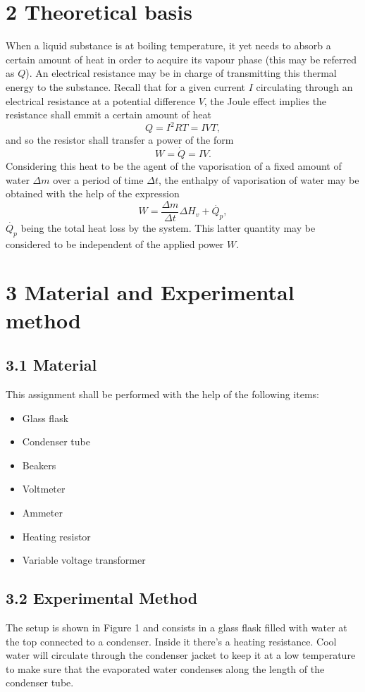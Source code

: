 \documentclass[a4paper, 12pt]{article}
\begin{document}
	\section{2 Theoretical basis}
	When a liquid substance is at boiling temperature, it yet needs to absorb a certain amount of heat in order to acquire its vapour phase (this may be referred as $Q$). An electrical resistance may be in charge of transmitting this thermal energy to the substance. Recall that for a given current $I$ circulating through an electrical resistance at a potential difference $V$, the Joule effect implies the resistance shall emmit a certain amount of heat
	\begin{equation*}\label{qjoule}
		Q = I^2 R T= I V T, 
	\end{equation*}
	and so the resistor shall transfer a power of the form 
	\begin{equation}\label{pjoule}
		W = \dot{Q} = I V.
	\end{equation}
Considering this heat to be the agent of the vaporisation of a fixed amount of water $\Delta m$ over a period of time $\Delta t$, the enthalpy of vaporisation of water may be obtained with the help of the expression
\begin{equation}\label{enthalpprimitive}
	W = \frac{\Delta m}{\Delta t} \Delta H_v + \dot{Q_p},
 \end{equation}
$\dot{Q_p}$ being the total heat loss by the system. This latter quantity may be considered to be independent of the applied power $W$.
\section{3 Material and Experimental method}
\subsection{3.1 Material}
This assignment shall be performed with the help of the following items:
\begin{itemize}
	\item Glass flask
	\item Condenser tube
	\item Beakers
	\item Voltmeter
	\item Ammeter
	\item Heating resistor
	\item Variable voltage transformer
\end{itemize}
\subsection{3.2 Experimental Method}
The setup is shown in Figure 1 and consists in a glass flask filled with water at the top connected to a condenser. Inside it there's a heating resistance. Cool water will circulate through the condenser jacket to keep it at a low temperature to make sure that the evaporated water condenses along the length of the condenser tube.
\end{document}
